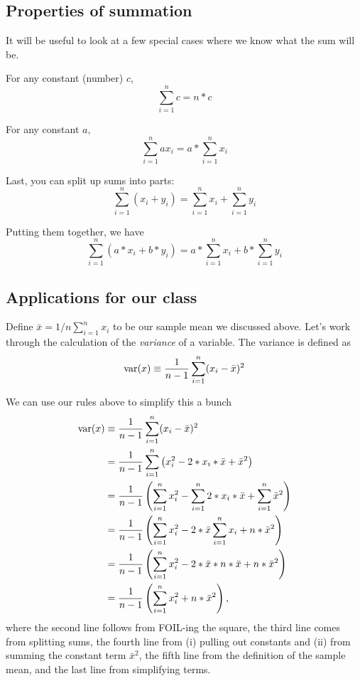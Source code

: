 \documentclass[12pt]{article}
\begin{document}
\subsection{Properties of summation}

It will be useful to look at a few special cases where we know what the sum will be.

For any constant (number) $c$,
\begin{equation*}
  \sum_{i=1}^n c = n*c
\end{equation*}

For any constant $a$, 
\begin{equation*}
  \sum_{i=1}^n a x_i = a * \sum_{i=1}^n x_i
\end{equation*}

Last, you can split up sums into parts:
\begin{equation*}
  \sum_{i=1}^n (x_i + y_i) = \sum_{i=1}^n x_i + \sum_{i=1}^n y_i
\end{equation*}

Putting them together, we have 
\begin{equation*}
  \sum_{i=1}^n (a*x_i + b*y_i) = a * \sum_{i=1}^n x_i + b * \sum_{i=1}^n y_i
\end{equation*}



\subsection{Applications for our class}

Define $\bar{x} = 1/n \sum_{i=1}^n x_i$ to be our sample mean we discussed above. Let's work through the calculation of the \emph{variance} of a variable. The variance is defined as 
$$ \var(x) \equiv \frac{1}{n-1} \sum_{i=1}^n (x_i - \bar{x})^2 $$

We can use our rules above to simplify this a bunch
\begin{align*}
  \var(x) 
  &\equiv \frac{1}{n-1} \sum_{i=1}^n (x_i - \bar{x})^2 \\
  &= \frac{1}{n-1} \sum_{i=1}^n \left( x_i^2 - 2 * x_i * \bar{x} + \bar{x}^2\right) \\
  &= \frac{1}{n-1} \left( \sum_{i=1}^n x_i^2 - \sum_{i=1}^n 2 * x_i * \bar{x} + \sum_{i=1}^n \bar{x}^2 \right) \\
  &= \frac{1}{n-1} \left( \sum_{i=1}^n x_i^2 - 2 * \bar{x} \sum_{i=1}^n x_i + n * \bar{x}^2 \right) \\
  &= \frac{1}{n-1} \left( \sum_{i=1}^n x_i^2 - 2 * \bar{x} * n * \bar{x} + n * \bar{x}^2 \right) \\
  &= \frac{1}{n-1} \left( \sum_{i=1}^n x_i^2 + n * \bar{x}^2 \right),
\end{align*}
where the second line follows from FOIL-ing the square, the third line comes from splitting sums, the fourth line from (i) pulling out constants and (ii) from summing the constant term $\bar{x}^2$, the fifth line from the definition of the sample mean, and the last line from simplifying terms.
\end{document}
